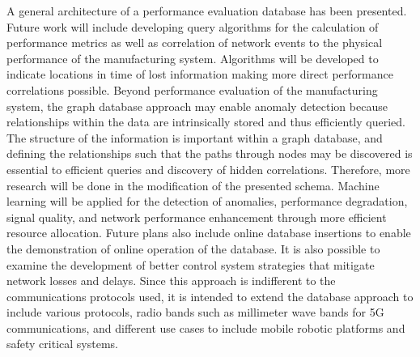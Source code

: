 A general architecture of a performance evaluation database has been presented.  Future work will include developing query algorithms for the calculation of performance metrics as well as correlation of network events to the physical performance of the manufacturing system.  Algorithms will be developed to indicate locations in time of lost information making more direct performance correlations possible.  Beyond performance evaluation of the manufacturing system, the graph database approach may enable anomaly detection because relationships within the data are intrinsically stored and thus efficiently queried.  The structure of the information is important within a graph database, and defining the relationships such that the paths through nodes may be discovered is essential to efficient queries and discovery of hidden correlations.  Therefore, more research will be done in the modification of the presented schema.  Machine learning will be applied for the detection of anomalies, performance degradation, signal quality, and network performance enhancement through more efficient resource allocation.  Future plans also include online database insertions to enable the demonstration of online operation of the database.   It is also possible to examine the development of better control system strategies that mitigate network losses and delays.  Since this approach is indifferent to the communications  protocols used, it is intended to extend the database approach to include various protocols, radio bands such as millimeter wave bands for 5G communications, and different use cases to include mobile robotic platforms and safety critical systems.

